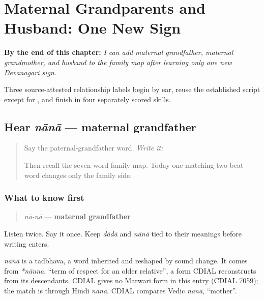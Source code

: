 
\chapter{Maternal Grandparents and Husband: One New Sign}
\label{ch:mw-family-ten}

\begin{chapteropening}
\textbf{By the end of this chapter:} \emph{I can add maternal grandfather, maternal grandmother, and husband to the family map after learning only one new Devanagari sign.}

Three source-attested relationship labels begin by ear, reuse the established script except for , and finish in four separately scored skills.
\end{chapteropening}

\section[nānā]{Hear \emph{nānā} — maternal grandfather}

\label{lesson:MW-C09-hear-nana}



\begin{quote}
Say the paternal-grandfather word. \emph{Write it:} \textbf{}

Then recall the seven-word family map. Today one matching two-beat word changes only the family side.
\end{quote}

\subsection*{What to know first}
\begin{quote}
\emph{nā-nā} — \textbf{maternal grandfather}
\end{quote}

Listen twice. Say it once. Keep \emph{dādā} and \emph{nānā} tied to their meanings before writing enters.

\begin{cousinweb}
\emph{nānā} is a tadbhava, a word inherited and reshaped by sound change. It comes from \emph{*nānna}, \textquotedblleft{}term of respect for an older relative\textquotedblright{}, a form CDIAL reconstructs from its descendants. CDIAL gives no Marwari form in this entry (CDIAL 7059); the match is through Hindi \emph{nānā}. CDIAL compares Vedic \emph{nanā}, \textquotedblleft{}mother\textquotedblright{}.
\end{cousinweb}

